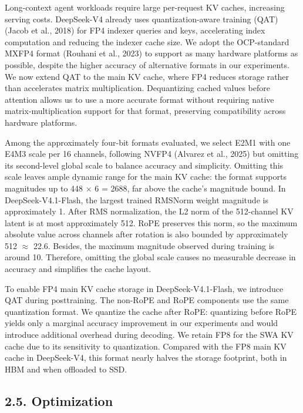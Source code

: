 \documentclass[
  10
]{article}
\begin{document}
Long-context agent workloads require large per-request KV caches,
increasing serving costs. DeepSeek-V4 already uses quantization-aware
training (QAT) (Jacob et al., 2018) for FP4 indexer queries and keys,
accelerating index computation and reducing the indexer cache size. We
adopt the OCP-standard MXFP4 format (Rouhani et al., 2023) to support as
many hardware platforms as possible, despite the higher accuracy of
alternative formats in our experiments. We now extend QAT to the main KV
cache, where FP4 reduces storage rather than accelerates matrix
multiplication. Dequantizing cached values before attention allows us to
use a more accurate format without requiring native
matrix-multiplication support for that format, preserving compatibility
across hardware platforms.

Among the approximately four-bit formats evaluated, we select E2M1 with
one E4M3 scale per 16 channels, following NVFP4 (Alvarez et al., 2025)
but omitting its second-level global scale to balance accuracy and
simplicity. Omitting this scale leaves ample dynamic range for the main
KV cache: the format supports magnitudes up to 448 $\times$ 6 = 2688, far above
the cache's magnitude bound. In DeepSeek-V4.1-Flash, the largest trained
RMSNorm weight magnitude is approximately 1. After RMS normalization,
the L2 norm of the 512-channel KV latent is at most approximately 512.
RoPE preserves this norm, so the maximum absolute value across channels
after rotation is also bounded by approximately 512 $\approx$ 22.6. Besides, the
maximum magnitude observed during training is around 10. Therefore,
omitting the global scale causes no measurable decrease in accuracy and
simplifies the cache layout.

To enable FP4 main KV cache storage in DeepSeek-V4.1-Flash, we introduce
QAT during posttraining. The non-RoPE and RoPE components use the same
quantization format. We quantize the cache after RoPE: quantizing before
RoPE yields only a marginal accuracy improvement in our experiments and
would introduce additional overhead during decoding. We retain FP8 for
the SWA KV cache due to its sensitivity to quantization. Compared with
the FP8 main KV cache in DeepSeek-V4, this format nearly halves the
storage footprint, both in HBM and when offloaded to SSD.

\subsection{2.5. Optimization}\label{optimization}
\end{document}
